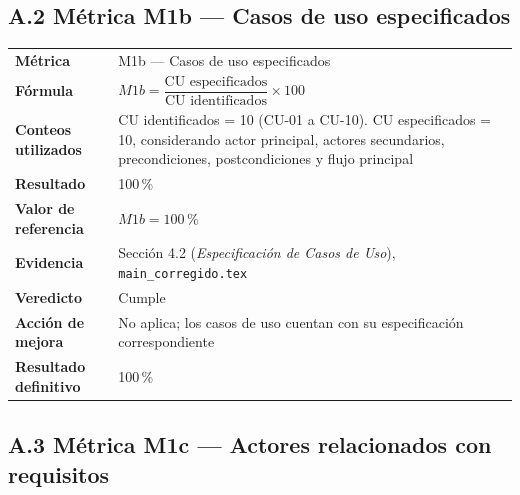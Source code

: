 \subsection*{A.2 Métrica M1b — Casos de uso especificados}

\begin{tabular}{p{3.2cm}p{9.5cm}}
\hline
\textbf{Métrica} & M1b — Casos de uso especificados \\

\textbf{Fórmula} &
$M1b =
\dfrac{\text{CU especificados}}
{\text{CU identificados}}\times100$ \\

\textbf{Conteos utilizados} &
CU identificados = 10 (CU-01 a CU-10). \newline
CU especificados = 10, considerando actor principal, actores secundarios,
precondiciones, postcondiciones y flujo principal \\

\textbf{Resultado} & 100\,\% \\

\textbf{Valor de referencia} & $M1b = 100\,\%$ \\

\textbf{Evidencia} &
Sección 4.2 (\emph{Especificación de Casos de Uso}),
\texttt{main\_corregido.tex} \\

\textbf{Veredicto} & Cumple \\

\textbf{Acción de mejora} &
No aplica; los casos de uso cuentan con su especificación correspondiente \\

\textbf{Resultado definitivo} & 100\,\% \\

\hline
\end{tabular}

\subsection*{A.3 Métrica M1c — Actores relacionados con requisitos}


